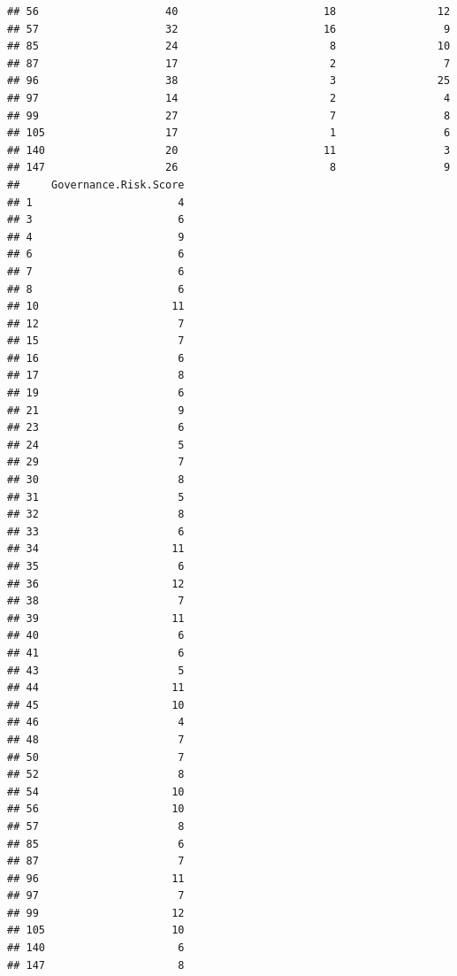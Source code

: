 \documentclass[
]{article}
\newenvironment{Shaded}{\begin{snugshade}}{\end{snugshade}}
\newcommand{\DecValTok}[1]{\textcolor[rgb]{0.00,0.00,0.81}{#1}}
\newcommand{\KeywordTok}[1]{\textcolor[rgb]{0.13,0.29,0.53}{\textbf{#1}}}
\newcommand{\NormalTok}[1]{#1}
\newcommand{\OperatorTok}[1]{\textcolor[rgb]{0.81,0.36,0.00}{\textbf{#1}}}
\newcommand{\StringTok}[1]{\textcolor[rgb]{0.31,0.60,0.02}{#1}}
\begin{document}
\begin{verbatim}
## 56                    40                       18                12
## 57                    32                       16                 9
## 85                    24                        8                10
## 87                    17                        2                 7
## 96                    38                        3                25
## 97                    14                        2                 4
## 99                    27                        7                 8
## 105                   17                        1                 6
## 140                   20                       11                 3
## 147                   26                        8                 9
##     Governance.Risk.Score
## 1                       4
## 3                       6
## 4                       9
## 6                       6
## 7                       6
## 8                       6
## 10                     11
## 12                      7
## 15                      7
## 16                      6
## 17                      8
## 19                      6
## 21                      9
## 23                      6
## 24                      5
## 29                      7
## 30                      8
## 31                      5
## 32                      8
## 33                      6
## 34                     11
## 35                      6
## 36                     12
## 38                      7
## 39                     11
## 40                      6
## 41                      6
## 43                      5
## 44                     11
## 45                     10
## 46                      4
## 48                      7
## 50                      7
## 52                      8
## 54                     10
## 56                     10
## 57                      8
## 85                      6
## 87                      7
## 96                     11
## 97                      7
## 99                     12
## 105                    10
## 140                     6
## 147                     8
\end{verbatim}

\begin{Shaded}
\end{Shaded}
\end{document}
